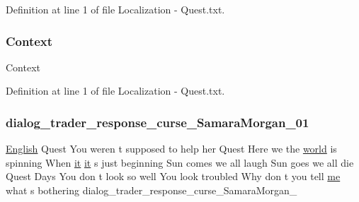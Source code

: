Definition at line 1 of file Localization -\/ Quest.\+txt.

\mbox{\label{_the_01_restless_01_curse_2_config_2_localization_01-_01_quest_8txt_abbebfae2c8b3c06e3115e79965277840}} 
\subsubsection{\texorpdfstring{Context}{Context}}
{\footnotesize\ttfamily Context}



Definition at line 1 of file Localization -\/ Quest.\+txt.

\mbox{\label{_the_01_restless_01_curse_2_config_2_localization_01-_01_quest_8txt_a035e7e6977e304a6cd0e6d1fac90e916}} 
\subsubsection{\texorpdfstring{dialog\_trader\_response\_curse\_SamaraMorgan\_01}{dialog\_trader\_response\_curse\_SamaraMorgan\_01}}
{\footnotesize\ttfamily \mbox{\hyperlink{_sphere_i_i_01_winter_01_project_2_config_2_localization_8txt_ad896b63205779b1b09e86d941ce13976}{English}} Quest You weren t supposed to help her Quest Here we the \mbox{\hyperlink{_sphere_i_i_01_music_01_boxes_2_config_2_localization_8txt_a7ede01351426b1b7f6c1ce5f794e474f}{world}} is spinning When \mbox{\hyperlink{_the_01_restless_01_curse_2_config_2_localization_01-_01_quest_8txt_a741b285909bea4855b886664c2dcd50c}{it}} \mbox{\hyperlink{_the_01_restless_01_curse_2_config_2_localization_01-_01_quest_8txt_a741b285909bea4855b886664c2dcd50c}{it}} s just beginning Sun comes we all laugh Sun goes we all die Quest Days You don t look so well You look troubled Why don t you tell \mbox{\hyperlink{_blooms_01_animal_01_husbandry_2_config_2_localization_8txt_a290fbecf7c016b09bc675718400d6fca}{me}} what s bothering dialog\+\_\+trader\+\_\+response\+\_\+curse\+\_\+\+Samara\+Morgan\+\_}



